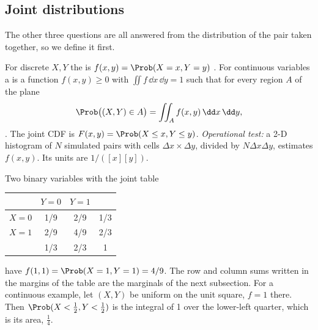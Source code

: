 \subsection{Joint distributions}

The other three questions are all answered from the distribution of the
pair taken together, so we define it first.

\begin{workdef}
For discrete $X,Y$ the  is
$f(x,y)=\Prob(X=x,Y=y)$ . For continuous variables a
 is a function $f(x,y)\ge0$ with
$\iint f\,\dd x\,\dd y=1$ such that for every region $A$ of the plane
\[
  \Prob\bigl((X,Y)\in A\bigr)=\iint_A f(x,y)\,\dd x\,\dd y ,
\]
. The joint CDF is
$F(x,y)=\Prob(X\le x,Y\le y)$.
\emph{Operational test:} a 2-D histogram of $N$ simulated pairs with cells
$\Delta x\times\Delta y$, divided by $N\Delta x\Delta y$, estimates $f(x,y)$.
Its units are $1/([x][y])$.
\end{workdef}

\label{1b:ex:joint-table}
Two binary variables with the joint table 
\begin{center}
\begin{tabular}{c|cc|c}
 & $Y=0$ & $Y=1$ & \\\hline
$X=0$ & 1/9 & 2/9 & 1/3\\
$X=1$ & 2/9 & 4/9 & 2/3\\\hline
 & 1/3 & 2/3 & 1
\end{tabular}
\end{center}
have $f(1,1)=\Prob(X=1,Y=1)=4/9$. The row and column sums written in the
margins of the table are the marginals of the next subsection. For a
continuous example, let
$(X,Y)$ be uniform on the unit square, $f=1$ there. Then
$\Prob(X<\tfrac12,Y<\tfrac12)$ is the integral of 1 over the lower-left
quarter, which is its area, $\tfrac14$.

